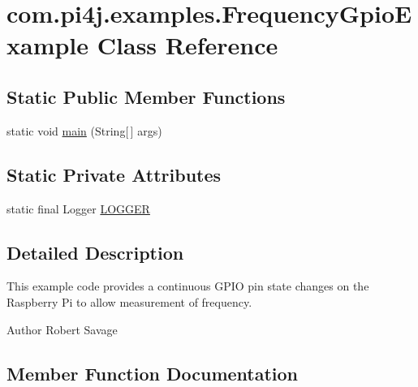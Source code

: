 \hypertarget{classcom_1_1pi4j_1_1examples_1_1FrequencyGpioExample}{}\section{com.\+pi4j.\+examples.\+Frequency\+Gpio\+Example Class Reference}
\label{classcom_1_1pi4j_1_1examples_1_1FrequencyGpioExample}
\subsection*{Static Public Member Functions}
\begin{DoxyCompactItemize}
\item 
static void \hyperlink{classcom_1_1pi4j_1_1examples_1_1FrequencyGpioExample_a7aa7e22b034f94ba794e9ed2005305c4}{main} (String\mbox{[}$\,$\mbox{]} args)
\end{DoxyCompactItemize}
\subsection*{Static Private Attributes}
\begin{DoxyCompactItemize}
\item 
static final Logger \hyperlink{classcom_1_1pi4j_1_1examples_1_1FrequencyGpioExample_a3d0645e2d0163919ac0caa7af24da6b1}{L\+O\+G\+G\+E\+R}
\end{DoxyCompactItemize}


\subsection{Detailed Description}
This example code provides a continuous G\+P\+I\+O pin state changes on the Raspberry Pi to allow measurement of frequency.

\begin{DoxyAuthor}{Author}
Robert Savage 
\end{DoxyAuthor}


\subsection{Member Function Documentation}
\hypertarget{classcom_1_1pi4j_1_1examples_1_1FrequencyGpioExample_a7aa7e22b034f94ba794e9ed2005305c4}{}
